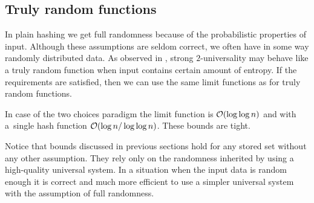 \subsection{Truly random functions}
\label{subsection-truly-random-functions}
In plain hashing we get full randomness because of the probabilistic properties of input. Although these assumptions are seldom correct, we often have in some way randomly distributed data. As observed in \cite{DBLP:conf/soda/MitzenmacherV08}, strong $2$-universality may behave like a truly random function when input contains certain amount of entropy. If the requirements are satisfied, then we can use the same limit functions as for truly random functions.

In case of the two choices paradigm the limit function is $\mathcal{O}(\log \log n)$ and with a~single hash function $\mathcal{O}(\log n / \log \log n)$. These bounds are tight.

Notice that bounds discussed in previous sections hold for any stored set without any other assumption. They rely only on the randomness inherited by using a high-quality universal system. In a situation when the input data is random enough it is correct and much more efficient to use a simpler universal system with the assumption of full randomness.
